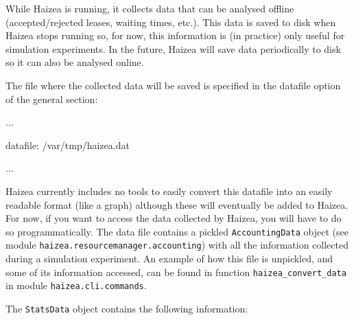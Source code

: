 While Haizea is running, it collects data that can be analysed offline (accepted/rejected leases, waiting times, etc.). This data is saved to disk when Haizea stops running so, for now, this information is (in practice) only useful for simulation experiments. In the future, Haizea will save data periodically to disk so it can also be analysed online.

The file where the collected data will be saved is specified in the datafile option of the general section:

\begin{wideshellverbatim}
[general]
...

datafile: /var/tmp/haizea.dat

...
\end{wideshellverbatim}

Haizea currently includes no tools to easily convert this datafile into an easily readable format (like a graph) although these will eventually be added to Haizea. For now, if you want to access the data collected by Haizea, you will have to do so programmatically. The data file contains a pickled \texttt{AccountingData} object (see module \texttt{haizea.resourcemanager.accounting}) with all the information collected during a simulation experiment. An example of how this file is unpickled, and some of its information accessed, can be found in function \texttt{haizea\_convert\_data} in module \texttt{haizea.cli.commands}.

The \texttt{StatsData} object contains the following information:

